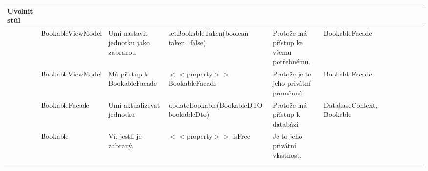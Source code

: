 \begin{landscape}
\begin{longtable}{ Lp{3cm} | Lp{3.5cm} | Lp{4.5cm} | Lp{4cm} | Lp{4.5cm} | Lp{4cm} }
    Uvolnit stůl & & & & & \\
    \hline
    & BookableViewModel & Umí nastavit jednotku jako zabranou & setBookableTaken(boolean taken=false) & Protože má přístup ke všemu potřebnému. & BookableFacade\\
    & BookableViewModel & Má přístup k BookableFacade & $<<$property$>>$ BookableFacade & Protože je to jeho privátní proměnná & BookableFacade \\
    & BookableFacade & Umí aktualizovat jednotku & updateBookable(BookableDTO bookableDto) & Protože má přístup k databázi & DatabaseContext, Bookable\\
    & Bookable & Ví, jestli je zabraný. & $<<$property$>>$ isFree & Je to jeho privátní vlastnost. & \\
    & & & & & \\
    & & & & & \\
    
    
    
    \hline
\end{longtable}
\end{landscape}
